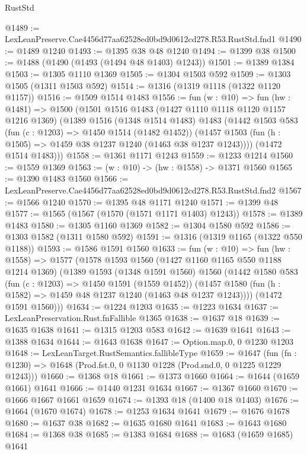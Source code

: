 \begin{lexlean}{RustStd}
\begin{coremodule}
@1489 := LexLeanPreserve.Cae4456d77aa62528ed0bd9d0612cd278.R53.RustStd.fnd1
@1490 := @1489 @1240
@1493 := @1395 @38 @48 @1240
@1494 := @1399 @38
@1500 := @1488 (@1490 (@1493 (@1494 @48 @1403) @1243))
@1501 := @1389 @1384
@1503 := @1305 @1110 @1369
@1505 := @1304 @1503 @592
@1509 := @1303 @1505 (@1311 @1503 @592)
@1514 := @1316 (@1319 @1118 (@1322 @1120 @1157))
@1516 := @1509 @1514 @1483
@1556 := fun (w : @10) =>
  fun (hw : @1481) =>
  @1500
    (@1501
      @1516
      @1483
      (@1427 @1110 @1118 @1120 @1157 @1216 @1369)
      (@1389
        @1516
        (@1348 @1514 @1483)
        @1483
        (@1442
          @1503
          @583
          (fun (c : @1203) => @1450 @1514 (@1482 @1452))
          (@1457 @1503 (fun (h : @1505) => @1459 @38 @1237 @1240 (@1463 @38 @1237 @1243))))
        (@1472 @1514 @1483)))
@1558 := @1361 @1171 @1243
@1559 := @1233 @1214
@1560 := @1559 @1369
@1563 := (w : @10) -> (hw : @1558) -> @1371 @1560
@1565 := @1390 @1483 @1560
@1566 := LexLeanPreserve.Cae4456d77aa62528ed0bd9d0612cd278.R53.RustStd.fnd2
@1567 := @1566 @1240
@1570 := @1395 @48 @1171 @1240
@1571 := @1399 @48
@1577 := @1565 (@1567 (@1570 (@1571 @1171 @1403) @1243))
@1578 := @1389 @1483
@1580 := @1305 @1160 @1369
@1582 := @1304 @1580 @592
@1586 := @1303 @1582 (@1311 @1580 @592)
@1591 := @1316 (@1319 @1165 (@1322 @550 @1188))
@1593 := @1586 @1591 @1560
@1633 := fun (w : @10) =>
  fun (hw : @1558) =>
  @1577
    (@1578
      @1593
      @1560
      (@1427 @1160 @1165 @550 @1188 @1214 @1369)
      (@1389
        @1593
        (@1348 @1591 @1560)
        @1560
        (@1442
          @1580
          @583
          (fun (c : @1203) => @1450 @1591 (@1559 @1452))
          (@1457 @1580 (fun (h : @1582) => @1459 @48 @1237 @1240 (@1463 @48 @1237 @1243))))
        (@1472 @1591 @1560)))
@1634 := @1224 @1203
@1635 := @1223 @1634
@1637 := LexLeanPreservation.Rust.fnFallible @1365
@1638 := @1637 @18
@1639 := @1635 @1638
@1641 := @1315 @1203 @583
@1642 := @1639 @1641
@1643 := @1388 @1634
@1644 := @1643 @1638
@1647 := Option.map.{0, 0} @1230 @1203
@1648 := LexLeanTarget.RustSemantics.fallibleType
@1659 := @1647
    (fun (fn : @1230) => @1648 (Prod.fst.{0, 0} @1130 @1228 (Prod.snd.{0, 0} @1225 @1229 @1243)))
@1660 := @1368 @18
@1661 := @1373 @1660
@1664 := @1644 (@1659 @1661) @1641
@1666 := @1440 @1231 @1634
@1667 := @1367 @1660
@1670 := @1666 @1667 @1661 @1659
@1674 := @1393 @18 (@1400 @18 @1403)
@1676 := @1664 (@1670 @1674)
@1678 := @1253 @1634 @1641
@1679 := @1676 @1678
@1680 := @1637 @38
@1682 := @1635 @1680 @1641
@1683 := @1643 @1680
@1684 := @1368 @38
@1685 := @1383 @1684
@1688 := @1683 (@1659 @1685) @1641

\end{coremodule}
\end{lexlean}
